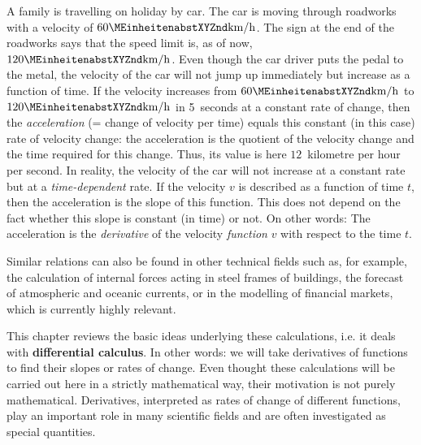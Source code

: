 

\Mtikzexternalize
{}





\begin{MSectionStart}

\MModstartBox
\end{MSectionStart}


\begin{MIntro}

A family is travelling on holiday by car. The car is moving through roadworks with a velocity of 
$60\MEinheit{km}/\MEinheit[]{h}$. The sign
at the end of the roadworks says that the speed limit is, as of now,  
$120\MEinheit{km}/\MEinheit[]{h}$. Even though the car driver puts the pedal to the metal,
the velocity of the car will not jump up immediately but increase as a function of time.
If the velocity increases from $60\MEinheit{km}/\MEinheit[]{h}$ to $120\MEinheit{km}/\MEinheit[]{h}$ 
 in 5~seconds at a constant rate of change, then
the \emph{acceleration} (= change of velocity per time) equals 
this constant (in this case) rate of velocity change: the acceleration is the quotient of 
the velocity change and the time required for this change. Thus, its value is here
$12$~kilometre per hour per second. In reality, the velocity of the car will not increase
at a constant rate but at a \emph{time-dependent} rate.
If the velocity $v$ is described as a function of time $t$, then the 
acceleration is the slope of this function. This does not depend on the fact 
whether this slope is constant (in time) or not. On other words: The acceleration
is the \emph{derivative} of the velocity \emph{function} $v$ with respect to the time $t$.

Similar relations can also be found in other technical fields such as, for example, the calculation of 
internal forces acting in steel frames of buildings, the forecast of atmospheric and oceanic 
currents, or in the modelling of financial markets, which is currently highly relevant.

This chapter reviews the basic ideas underlying these calculations, i.e. it deals with 
\textbf{differential calculus}. In other words: we will take derivatives of functions 
to find their slopes or rates of change. Even thought these calculations 
will be carried out here in a strictly mathematical way, their motivation is not 
purely mathematical. Derivatives, interpreted as rates of change of different functions,
play an important role in many scientific fields and are often investigated as special
quantities.

\end{MIntro}

